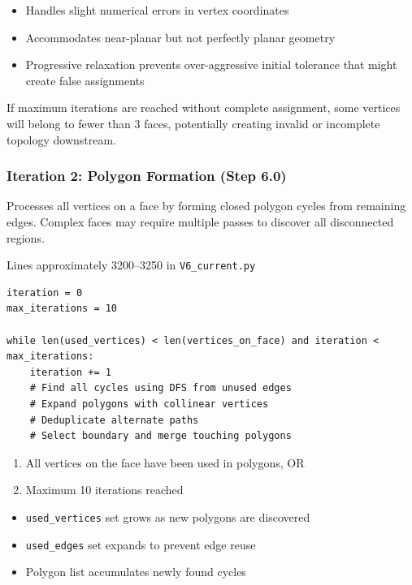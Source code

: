 \begin{itemize}
    \item Handles slight numerical errors in vertex coordinates
    \item Accommodates near-planar but not perfectly planar geometry
    \item Progressive relaxation prevents over-aggressive initial tolerance that might create false assignments
\end{itemize}

If maximum iterations are reached without complete assignment, some vertices will belong to fewer than 3 faces, potentially creating invalid or incomplete topology downstream.

\subsubsection{Iteration 2: Polygon Formation (Step 6.0)}

Processes all vertices on a face by forming closed polygon cycles from remaining edges. Complex faces may require multiple passes to discover all disconnected regions.

Lines approximately 3200--3250 in \texttt{V6\_current.py}

\begin{lstlisting}
iteration = 0
max_iterations = 10

while len(used_vertices) < len(vertices_on_face) and iteration < max_iterations:
    iteration += 1
    # Find all cycles using DFS from unused edges
    # Expand polygons with collinear vertices
    # Deduplicate alternate paths
    # Select boundary and merge touching polygons
\end{lstlisting}

\begin{enumerate}
    \item All vertices on the face have been used in polygons, OR
    \item Maximum 10 iterations reached
\end{enumerate}

\begin{itemize}
    \item \texttt{used\_vertices} set grows as new polygons are discovered
    \item \texttt{used\_edges} set expands to prevent edge reuse
    \item Polygon list accumulates newly found cycles
\end{itemize}

